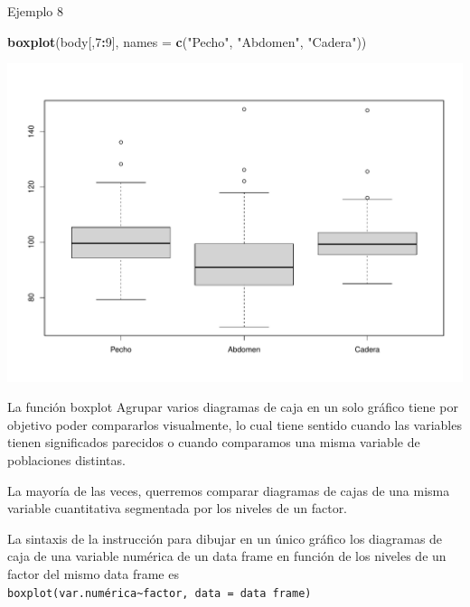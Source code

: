 \documentclass[
  ignorenonframetext,
]{beamer}
\newenvironment{Shaded}{\begin{snugshade}}{\end{snugshade}}
\newcommand{\AttributeTok}[1]{\textcolor[rgb]{0.13,0.29,0.53}{#1}}
\newcommand{\DecValTok}[1]{\textcolor[rgb]{0.00,0.00,0.81}{#1}}
\newcommand{\FunctionTok}[1]{\textcolor[rgb]{0.13,0.29,0.53}{\textbf{#1}}}
\newcommand{\NormalTok}[1]{#1}
\newcommand{\SpecialCharTok}[1]{\textcolor[rgb]{0.81,0.36,0.00}{\textbf{#1}}}
\newcommand{\StringTok}[1]{\textcolor[rgb]{0.31,0.60,0.02}{#1}}
\begin{document}
\begin{frame}[fragile]{Ejemplo 8}
\label{ejemplo-8-1}
\begin{Shaded}
\begin{Highlighting}[]
\FunctionTok{boxplot}\NormalTok{(body[,}\DecValTok{7}\SpecialCharTok{:}\DecValTok{9}\NormalTok{], }\AttributeTok{names =} \FunctionTok{c}\NormalTok{(}\StringTok{"Pecho"}\NormalTok{, }\StringTok{"Abdomen"}\NormalTok{, }\StringTok{"Cadera"}\NormalTok{))}
\end{Highlighting}
\end{Shaded}

\includegraphics[width=0.8\linewidth]{R_base_files/figure-beamer/unnamed-chunk-189-1}
\end{frame}

\begin{frame}[fragile]{La función boxplot}
\label{la-funciuxf3n-boxplot-3}
Agrupar varios diagramas de caja en un solo gráfico tiene por objetivo
poder compararlos visualmente, lo cual tiene sentido cuando las
variables tienen significados parecidos o cuando comparamos una misma
variable de poblaciones distintas.

La mayoría de las veces, querremos comparar diagramas de cajas de una
misma variable cuantitativa segmentada por los niveles de un factor.

La sintaxis de la instrucción para dibujar en un único gráfico los
diagramas de caja de una variable numérica de un data frame en función
de los niveles de un factor del mismo data frame es
\texttt{boxplot(var.numérica\textasciitilde{}factor,\ data\ =\ data\ frame)}
\end{frame}
\end{document}
